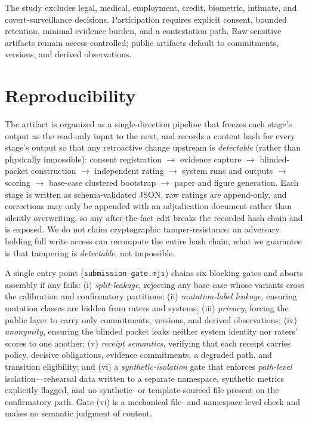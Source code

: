 \documentclass[sigconf,anonymous,review]{acmart}
\begin{document}
The study excludes legal, medical, employment, credit, biometric, intimate, and covert-surveillance decisions. Participation requires explicit consent, bounded retention, minimal evidence burden, and a contestation path. Raw sensitive artifacts remain access-controlled; public artifacts default to commitments, versions, and derived observations.

\section{Reproducibility}
The artifact is organized as a single-direction pipeline that freezes each stage's output as the read-only input to the next, and records a content hash for every stage's output so that any retroactive change upstream is \emph{detectable} (rather than physically impossible): consent registration $\to$ evidence capture $\to$ blinded-packet construction $\to$ independent rating $\to$ system runs and outputs $\to$ scoring $\to$ base-case clustered bootstrap $\to$ paper and figure generation. Each stage is written as schema-validated JSON, raw ratings are append-only, and corrections may only be appended with an adjudication document rather than silently overwriting, so any after-the-fact edit breaks the recorded hash chain and is exposed. We do not claim cryptographic tamper-resistance: an adversary holding full write access can recompute the entire hash chain; what we guarantee is that tampering is \emph{detectable}, not impossible.

A single entry point (\texttt{submission-gate.mjs}) chains six blocking gates and aborts assembly if any fails: (i) \emph{split-leakage}, rejecting any base case whose variants cross the calibration and confirmatory partitions; (ii) \emph{mutation-label leakage}, ensuring mutation classes are hidden from raters and systems; (iii) \emph{privacy}, forcing the public layer to carry only commitments, versions, and derived observations; (iv) \emph{anonymity}, ensuring the blinded packet leaks neither system identity nor raters' scores to one another; (v) \emph{receipt semantics}, verifying that each receipt carries policy, decisive obligations, evidence commitments, a degraded path, and transition eligibility; and (vi) a \emph{synthetic-isolation} gate that enforces \emph{path-level} isolation---rehearsal data written to a separate namespace, synthetic metrics explicitly flagged, and no synthetic- or template-sourced file present on the confirmatory path. Gate (vi) is a mechanical file- and namespace-level check and makes no semantic judgment of content.
\end{document}
